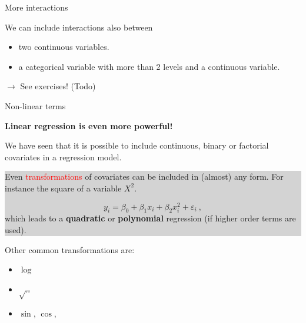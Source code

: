 \documentclass[10pt,ignorenonframetext,]{beamer}
\providecommand{\tightlist}{%
  \setlength{\itemsep}{0pt}\setlength{\parskip}{0pt}}
\begin{document}
\begin{frame}

\begin{block}{More interactions}

\vspace{2mm}

We can include interactions also between

\begin{itemize}
\tightlist
\item
  two continuous variables.
\item
  a categorical variable with more than 2 levels and a continuous
  variable.
\end{itemize}

\vspace{4mm}

\(\rightarrow\) See exercises! (Todo)

\vspace{4mm}

\end{block}

\end{frame}

\begin{frame}

\begin{block}{Non-linear terms}

\vspace{2mm}

\textbf{Linear regression is even more powerful!} \vspace{2mm}

We have seen that it is possible to include continuous, binary or
factorial covariates in a regression model.

\vspace{2mm}

\colorbox{lightgray}{\begin{minipage}{10cm}
Even \textcolor{red}{transformations} of covariates can be included in (almost) any form. For instance the square of a variable $X^2$.

\begin{equation*}
y_i = \beta_0 + \beta_1 x_i + \beta_2 x_i^2 + \varepsilon_i \ , 
\end{equation*}
which leads to a {\bf quadratic} or {\bf polynomial} regression (if higher order terms are used).
\end{minipage}}

\vspace{4mm}

Other common transformations are:

\begin{itemize}
\tightlist
\item
  \(\log\)
\item
  \(\sqrt{..}\)
\item
  \(\sin\), \(\cos\),
\end{itemize}

\end{block}

\end{frame}
\end{document}
